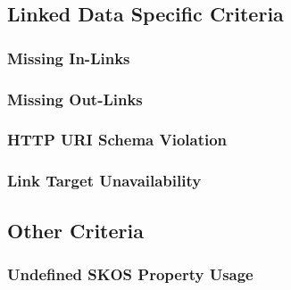 
\subsection{Linked Data Specific Criteria}

\subsubsection{Missing In-Links}

\subsubsection{Missing Out-Links}

\subsubsection{HTTP URI Schema Violation}

\subsubsection{Link Target Unavailability}



\subsection{Other Criteria}

\subsubsection{Undefined SKOS Property Usage}




